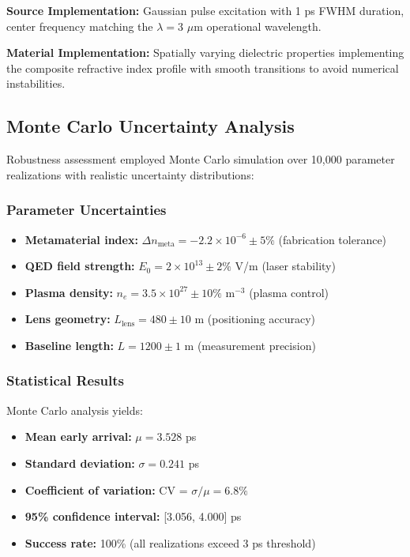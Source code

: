 \documentclass[aps,prl,reprint,groupedaddress,floatfix]{revtex4-1}
\begin{document}
\textbf{Source Implementation:} Gaussian pulse excitation with 1 ps FWHM duration, center frequency matching the $\lambda = 3$ $\mu$m operational wavelength.

\textbf{Material Implementation:} Spatially varying dielectric properties implementing the composite refractive index profile with smooth transitions to avoid numerical instabilities.

\subsection{Monte Carlo Uncertainty Analysis}

Robustness assessment employed Monte Carlo simulation over 10,000 parameter realizations with realistic uncertainty distributions:

\subsubsection{Parameter Uncertainties}

\begin{itemize}
    \item \textbf{Metamaterial index:} $\Delta n_{\text{meta}} = -2.2 \times 10^{-6} \pm 5\%$ (fabrication tolerance)
    \item \textbf{QED field strength:} $E_0 = 2 \times 10^{13} \pm 2\%$ V/m (laser stability)
    \item \textbf{Plasma density:} $n_e = 3.5 \times 10^{27} \pm 10\%$ m$^{-3}$ (plasma control)
    \item \textbf{Lens geometry:} $L_{\text{lens}} = 480 \pm 10$ m (positioning accuracy)
    \item \textbf{Baseline length:} $L = 1200 \pm 1$ m (measurement precision)
\end{itemize}

\subsubsection{Statistical Results}

Monte Carlo analysis yields:
\begin{itemize}
    \item \textbf{Mean early arrival:} $\mu = 3.528$ ps
    \item \textbf{Standard deviation:} $\sigma = 0.241$ ps  
    \item \textbf{Coefficient of variation:} CV = $\sigma/\mu = 6.8\%$
    \item \textbf{95\% confidence interval:} [3.056, 4.000] ps
    \item \textbf{Success rate:} 100\% (all realizations exceed 3 ps threshold)
\end{itemize}
\end{document}
